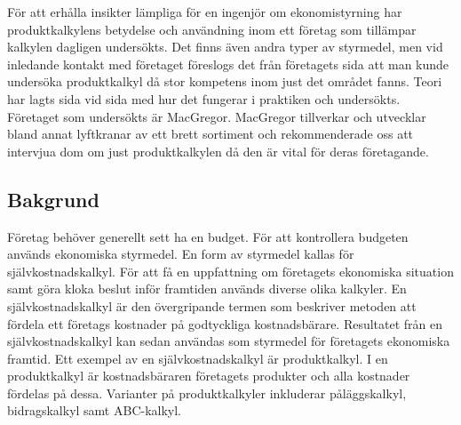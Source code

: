 För att erhålla insikter lämpliga för en ingenjör om ekonomistyrning har produktkalkylens betydelse och användning inom ett företag som tillämpar kalkylen dagligen undersökts.
Det finns även andra typer av styrmedel, men vid inledande kontakt med företaget föreslogs det från företagets sida att man kunde undersöka produktkalkyl då stor kompetens inom just det området fanns.
Teori har lagts sida vid sida med hur det fungerar i praktiken och undersökts.
Företaget som undersökts är MacGregor.
MacGregor tillverkar och utvecklar bland annat lyftkranar av ett brett sortiment och rekommenderade oss att intervjua dom om just produktkalkylen då den är vital för deras företagande.



%
%


%
%

\subsection{Bakgrund} 
Företag behöver generellt sett ha en budget.
För att kontrollera budgeten används ekonomiska styrmedel.
En form av styrmedel kallas för självkostnadskalkyl.
För att få en uppfattning om företagets ekonomiska situation samt göra kloka beslut inför framtiden används diverse olika kalkyler.
En självkostnadskalkyl är den övergripande termen som beskriver metoden att fördela ett företags kostnader på godtyckliga kostnadsbärare.
Resultatet från en självkostnadskalkyl kan sedan användas som styrmedel för företagets ekonomiska framtid.
Ett exempel av en självkostnadskalkyl är produktkalkyl.
I en produktkalkyl är kostnadsbäraren företagets produkter och alla kostnader fördelas på dessa.
Varianter på produktkalkyler inkluderar påläggskalkyl, bidragskalkyl samt ABC-kalkyl.

